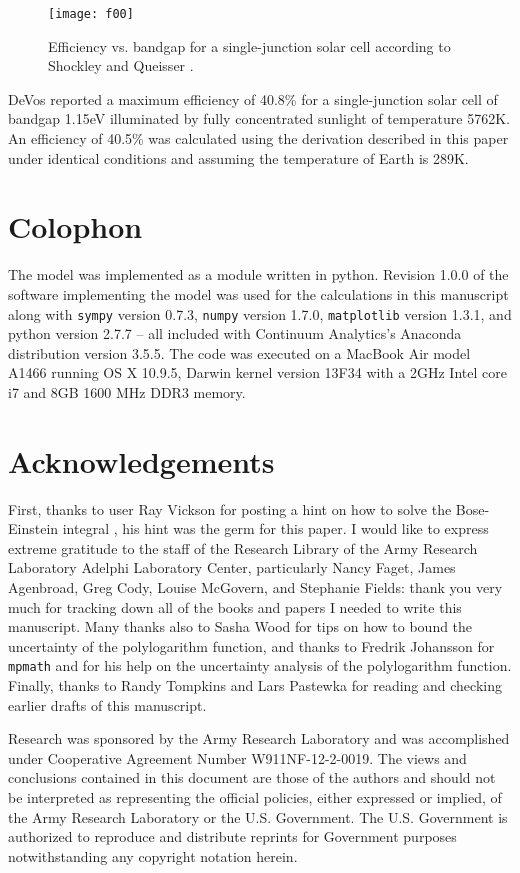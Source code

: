 \documentclass[letterpaper,12pt]{article}
\begin{document}
\begin{figure}
\texttt{[image: f00]}
\caption{Efficiency vs. bandgap for a single-junction solar cell according to Shockley and Queisser \cite{10.1063/1.1736034}.}
\label{fig:00}
\end{figure}


DeVos \cite{9780198513926} reported a maximum efficiency of 40.8\% for a single-junction solar cell of bandgap 1.15eV illuminated by fully concentrated sunlight of temperature 5762K. An efficiency of 40.5\% was calculated using the derivation described in this paper under identical conditions and assuming the temperature of Earth is 289K.


\section{Colophon}
The model was implemented as a module written in python. Revision 1.0.0 \cite{10.6084/m9.figshare.1229713} of the software implementing the model was used for the calculations in this manuscript along with \texttt{sympy} version 0.7.3, \texttt{numpy} version 1.7.0, \texttt{matplotlib} version 1.3.1, and python version 2.7.7 -- all included with Continuum Analytics's Anaconda distribution version 3.5.5.  The code was executed on a MacBook Air model A1466 running OS X 10.9.5, Darwin kernel version 13F34 with a 2GHz Intel core i7 and 8GB 1600 MHz DDR3 memory.


\section{Acknowledgements}
First, thanks to user Ray Vickson for posting a hint on how to solve the Bose-Einstein integral \cite{https://www.physicsforums.com/threads/a-bose-einstein-integral.751973}, his hint was the germ for this paper. I would like to express extreme gratitude to the staff of the Research Library of the Army Research Laboratory Adelphi Laboratory Center, particularly Nancy Faget, James Agenbroad, Greg Cody, Louise McGovern, and Stephanie Fields: thank you very much for tracking down all of the books and papers I needed to write this manuscript. Many thanks also to Sasha Wood for tips on how to bound the uncertainty of the polylogarithm function, and thanks to Fredrik Johansson for \texttt{mpmath} and for his help on the uncertainty analysis of the polylogarithm function. Finally, thanks to Randy Tompkins and Lars Pastewka for reading and checking earlier drafts of this manuscript.

Research was sponsored by the Army Research Laboratory and was accomplished under Cooperative Agreement Number W911NF-12-2-0019. The views and conclusions contained in this document are those of the authors and should not be interpreted as representing the official policies, either expressed or implied, of the Army Research Laboratory or the U.S. Government. The U.S. Government is authorized to reproduce and distribute reprints for Government purposes notwithstanding any copyright notation herein.




\end{document}
